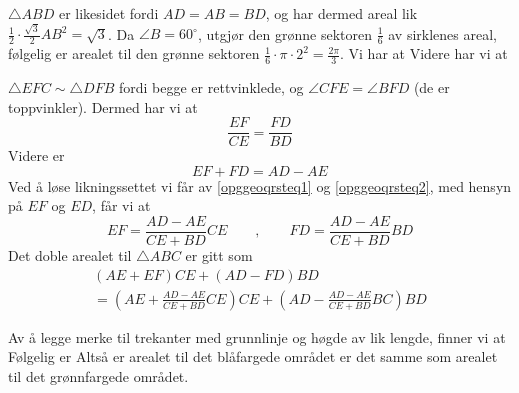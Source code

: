 $ \triangle ABD $ er likesidet fordi $ AD=AB=BD $, og har dermed areal lik $ \frac{1}{2}\cdot \frac{\sqrt{3}}{2}AB^2=\sqrt{3} $. Da $ \angle B=60^\circ $, utgjør den grønne sektoren $ \frac{1}{6} $ av sirklenes areal, følgelig er arealet til den grønne sektoren $ \frac{1}{6}\cdot \pi\cdot2^2=\frac{2\pi}{3} $. Vi har at
Videre har vi at

$ {\triangle EFC \sim \triangle DFB} $ fordi begge er rettvinklede, og $ {\angle CFE = \angle BFD}$ (de er toppvinkler). Dermed har vi at
\begin{equation}\label{opggeoqrsteq1}
	\frac{EF}{CE}=\frac{FD}{BD} 
\end{equation}
Videre er
\begin{equation}\label{opggeoqrsteq2}
	EF+FD= AD-AE
\end{equation}
Ved å løse likningssettet vi får av \eqref{opggeoqrsteq1} og \eqref{opggeoqrsteq2}, med hensyn på $ EF $ og $ ED $, får vi at
\[ 
EF = \frac{AD-AE}{CE+BD}CE\qquad,\qquad  FD=\frac{AD-AE}{CE+BD}BD
\]
Det doble arealet til $ \triangle ABC $ er gitt som
\begin{multline*}
(AE+EF)CE+(AD-FD)BD \\=\left(AE+\frac{AD-AE}{CE+BD}CE\right)CE+\left(AD-\frac{AD-AE}{CE+BD}BC\right)BD	
\end{multline*}

\newpage
{}
Av å legge merke til trekanter med grunnlinje og høgde av lik lengde, finner vi at
Følgelig er
Altså er arealet til det blåfargede området er det samme som arealet til det grønnfargede området.\vsk


